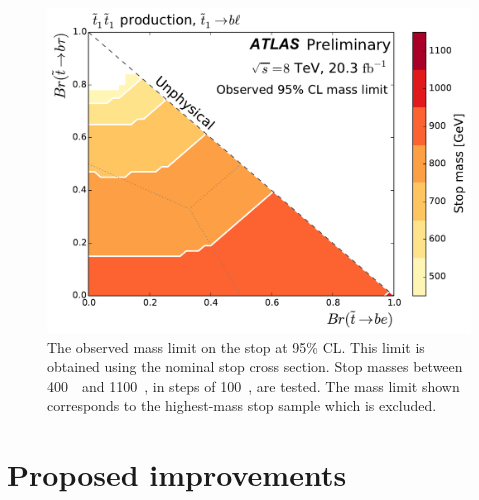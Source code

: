 \begin{figure}[p]
  \centering
  \includegraphics[width=\textwidth]
    {figs/blstop/mass_limit_contours_no_extras_obs.pdf}
  \caption{The observed mass limit on the stop at 95\% CL.
    This limit is obtained using the nominal stop cross section.
    Stop masses between 400~\GeV\ and 1100~\GeV, in steps of 100~\GeV, are
    tested.
    The mass limit shown corresponds to the highest-mass stop sample which is
    excluded.
  }
  \label{fig:mass_limit_obs}
\end{figure}

\FloatBarrier
\section{Proposed improvements}
\label{sec:improvements}

